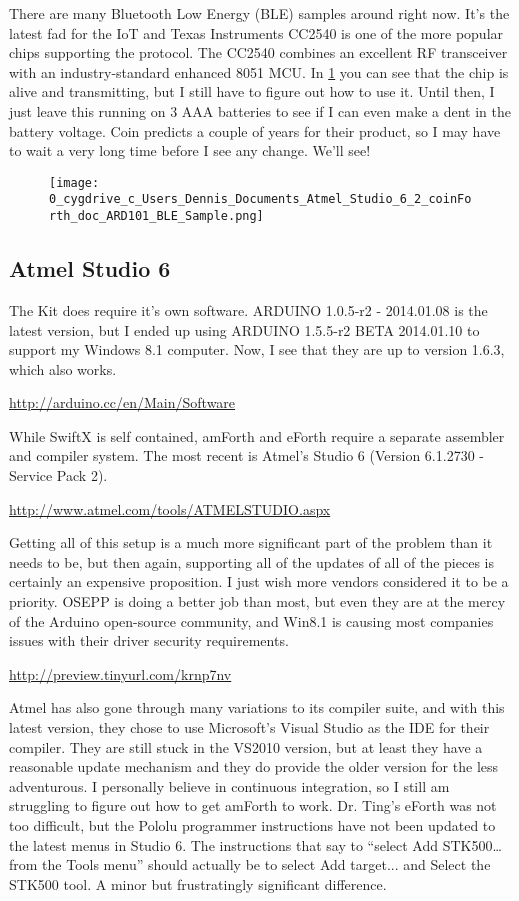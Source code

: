 \documentclass[10pt,english]{article}
\begin{document}
There are many Bluetooth Low Energy (BLE) samples around right now.
It's the latest fad for the IoT and Texas Instruments CC2540 is one
of the more popular chips supporting the protocol. The CC2540 combines
an excellent RF transceiver with an industry-standard enhanced 8051
MCU. In \ref{fig:BLE Sample} you can see that the chip is alive and
transmitting, but I still have to figure out how to use it. Until
then, I just leave this running on 3 AAA batteries to see if I can
even make a dent in the battery voltage. Coin predicts a couple of
years for their product, so I may have to wait a very long time before
I see any change. We'll see!

\begin{figure}
\caption{\label{fig:BLE Sample}\protect\texttt{[image: 0\_cygdrive\_c\_Users\_Dennis\_Documents\_Atmel\_Studio\_6\_2\_coinForth\_doc\_ARD101\_BLE\_Sample.png]}}


\end{figure}



\subsection{Atmel Studio 6}

The Kit does require it's own software. ARDUINO 1.0.5-r2 - 2014.01.08
is the latest version, but I ended up using ARDUINO 1.5.5-r2 BETA
2014.01.10 to support my Windows 8.1 computer. Now, I see that they
are up to version 1.6.3, which also works.

\url{http://arduino.cc/en/Main/Software}

While SwiftX is self contained, amForth and eForth require a separate
assembler and compiler system. The most recent is Atmel's Studio 6
(Version 6.1.2730 - Service Pack 2).

\url{http://www.atmel.com/tools/ATMELSTUDIO.aspx}

Getting all of this setup is a much more significant part of the problem
than it needs to be, but then again, supporting all of the updates
of all of the pieces is certainly an expensive proposition. I just
wish more vendors considered it to be a priority. OSEPP is doing a
better job than most, but even they are at the mercy of the Arduino
open-source community, and Win8.1 is causing most companies issues
with their driver security requirements.

\url{http://preview.tinyurl.com/krnp7nv}

Atmel has also gone through many variations to its compiler suite,
and with this latest version, they chose to use Microsoft's Visual
Studio as the IDE for their compiler. They are still stuck in the
VS2010 version, but at least they have a reasonable update mechanism
and they do provide the older version for the less adventurous. I
personally believe in continuous integration, so I still am struggling
to figure out how to get amForth to work. Dr. Ting's eForth was not
too difficult, but the Pololu programmer instructions have not been
updated to the latest menus in Studio 6. The instructions that say
to ``select Add STK500\ldots{} from the Tools menu'' should actually
be to select Add target... and Select the STK500 tool. A minor but
frustratingly significant difference.
\end{document}
